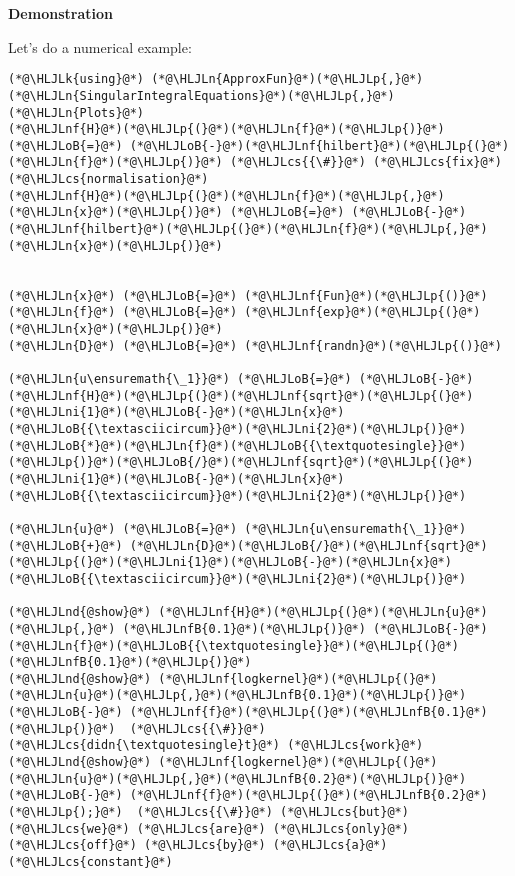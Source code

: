 \documentclass[12pt,landscape]{article}
\newcommand{\HLJLk}[1]{\textcolor[RGB]{148,91,176}{\textbf{#1}}}
\newcommand{\HLJLn}[1]{#1}
\newcommand{\HLJLnd}[1]{\textcolor[RGB]{214,102,97}{#1}}
\newcommand{\HLJLnf}[1]{\textcolor[RGB]{66,102,213}{#1}}
\newcommand{\HLJLnfB}[1]{\textcolor[RGB]{59,151,46}{#1}}
\newcommand{\HLJLni}[1]{\textcolor[RGB]{59,151,46}{#1}}
\newcommand{\HLJLoB}[1]{\textcolor[RGB]{102,102,102}{\textbf{#1}}}
\newcommand{\HLJLp}[1]{#1}
\newcommand{\HLJLcs}[1]{\textcolor[RGB]{153,153,119}{\textit{#1}}}
\begin{document}
{\textbf{Demonstration}

Let's do a numerical example:


\begin{lstlisting}
(*@\HLJLk{using}@*) (*@\HLJLn{ApproxFun}@*)(*@\HLJLp{,}@*) (*@\HLJLn{SingularIntegralEquations}@*)(*@\HLJLp{,}@*) (*@\HLJLn{Plots}@*)
(*@\HLJLnf{H}@*)(*@\HLJLp{(}@*)(*@\HLJLn{f}@*)(*@\HLJLp{)}@*) (*@\HLJLoB{=}@*) (*@\HLJLoB{-}@*)(*@\HLJLnf{hilbert}@*)(*@\HLJLp{(}@*)(*@\HLJLn{f}@*)(*@\HLJLp{)}@*) (*@\HLJLcs{{\#}}@*) (*@\HLJLcs{fix}@*) (*@\HLJLcs{normalisation}@*)
(*@\HLJLnf{H}@*)(*@\HLJLp{(}@*)(*@\HLJLn{f}@*)(*@\HLJLp{,}@*)(*@\HLJLn{x}@*)(*@\HLJLp{)}@*) (*@\HLJLoB{=}@*) (*@\HLJLoB{-}@*)(*@\HLJLnf{hilbert}@*)(*@\HLJLp{(}@*)(*@\HLJLn{f}@*)(*@\HLJLp{,}@*)(*@\HLJLn{x}@*)(*@\HLJLp{)}@*)


(*@\HLJLn{x}@*) (*@\HLJLoB{=}@*) (*@\HLJLnf{Fun}@*)(*@\HLJLp{()}@*)
(*@\HLJLn{f}@*) (*@\HLJLoB{=}@*) (*@\HLJLnf{exp}@*)(*@\HLJLp{(}@*)(*@\HLJLn{x}@*)(*@\HLJLp{)}@*)
(*@\HLJLn{D}@*) (*@\HLJLoB{=}@*) (*@\HLJLnf{randn}@*)(*@\HLJLp{()}@*)

(*@\HLJLn{u\ensuremath{\_1}}@*) (*@\HLJLoB{=}@*) (*@\HLJLoB{-}@*)(*@\HLJLnf{H}@*)(*@\HLJLp{(}@*)(*@\HLJLnf{sqrt}@*)(*@\HLJLp{(}@*)(*@\HLJLni{1}@*)(*@\HLJLoB{-}@*)(*@\HLJLn{x}@*)(*@\HLJLoB{{\textasciicircum}}@*)(*@\HLJLni{2}@*)(*@\HLJLp{)}@*)(*@\HLJLoB{*}@*)(*@\HLJLn{f}@*)(*@\HLJLoB{{\textquotesingle}}@*)(*@\HLJLp{)}@*)(*@\HLJLoB{/}@*)(*@\HLJLnf{sqrt}@*)(*@\HLJLp{(}@*)(*@\HLJLni{1}@*)(*@\HLJLoB{-}@*)(*@\HLJLn{x}@*)(*@\HLJLoB{{\textasciicircum}}@*)(*@\HLJLni{2}@*)(*@\HLJLp{)}@*)

(*@\HLJLn{u}@*) (*@\HLJLoB{=}@*) (*@\HLJLn{u\ensuremath{\_1}}@*) (*@\HLJLoB{+}@*) (*@\HLJLn{D}@*)(*@\HLJLoB{/}@*)(*@\HLJLnf{sqrt}@*)(*@\HLJLp{(}@*)(*@\HLJLni{1}@*)(*@\HLJLoB{-}@*)(*@\HLJLn{x}@*)(*@\HLJLoB{{\textasciicircum}}@*)(*@\HLJLni{2}@*)(*@\HLJLp{)}@*)

(*@\HLJLnd{@show}@*) (*@\HLJLnf{H}@*)(*@\HLJLp{(}@*)(*@\HLJLn{u}@*)(*@\HLJLp{,}@*) (*@\HLJLnfB{0.1}@*)(*@\HLJLp{)}@*) (*@\HLJLoB{-}@*) (*@\HLJLn{f}@*)(*@\HLJLoB{{\textquotesingle}}@*)(*@\HLJLp{(}@*)(*@\HLJLnfB{0.1}@*)(*@\HLJLp{)}@*)
(*@\HLJLnd{@show}@*) (*@\HLJLnf{logkernel}@*)(*@\HLJLp{(}@*)(*@\HLJLn{u}@*)(*@\HLJLp{,}@*)(*@\HLJLnfB{0.1}@*)(*@\HLJLp{)}@*) (*@\HLJLoB{-}@*) (*@\HLJLnf{f}@*)(*@\HLJLp{(}@*)(*@\HLJLnfB{0.1}@*)(*@\HLJLp{)}@*)  (*@\HLJLcs{{\#}}@*) (*@\HLJLcs{didn{\textquotesingle}t}@*) (*@\HLJLcs{work}@*)
(*@\HLJLnd{@show}@*) (*@\HLJLnf{logkernel}@*)(*@\HLJLp{(}@*)(*@\HLJLn{u}@*)(*@\HLJLp{,}@*)(*@\HLJLnfB{0.2}@*)(*@\HLJLp{)}@*) (*@\HLJLoB{-}@*) (*@\HLJLnf{f}@*)(*@\HLJLp{(}@*)(*@\HLJLnfB{0.2}@*)(*@\HLJLp{);}@*)  (*@\HLJLcs{{\#}}@*) (*@\HLJLcs{but}@*) (*@\HLJLcs{we}@*) (*@\HLJLcs{are}@*) (*@\HLJLcs{only}@*) (*@\HLJLcs{off}@*) (*@\HLJLcs{by}@*) (*@\HLJLcs{a}@*) (*@\HLJLcs{constant}@*)
\end{lstlisting}

}
\end{document}
